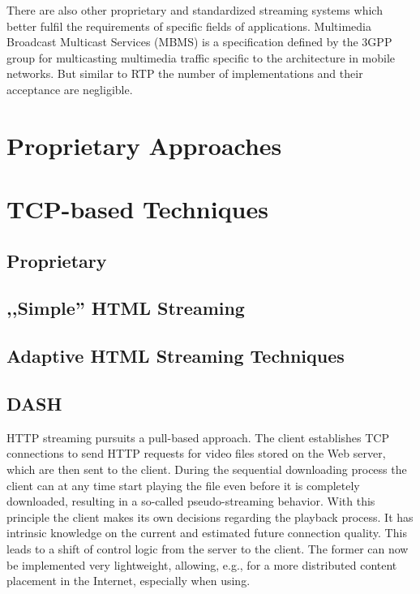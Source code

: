 There are also other proprietary and standardized streaming systems which better fulfil the requirements of specific fields of applications.  Multimedia Broadcast Multicast Services (MBMS)\cite{3gpp22146,3gpp22246} is a specification defined by the 3GPP group for multicasting multimedia traffic specific to the architecture in mobile networks. But similar to RTP the number of implementations and their acceptance are negligible.





\section{Proprietary Approaches}



\section{TCP-based Techniques}
\subsection{Proprietary}
\subsection{,,Simple'' HTML Streaming}
\subsection{Adaptive HTML Streaming Techniques}
\subsection{\ac{DASH}}



HTTP streaming pursuits a pull-based approach. The client establishes TCP connections to send HTTP requests for video files stored on the Web server, which are then sent to the client. During the sequential downloading process the client can at any time start playing the file even before it is completely downloaded, resulting in a so-called pseudo-streaming behavior.
With this principle the client makes its own decisions regarding the playback process. It has intrinsic knowledge on the current and estimated future connection quality. This leads to a shift of control logic from the server to the client. The former can now be implemented very lightweight, allowing, e.g., for a more distributed content placement in the Internet, especially when using.

